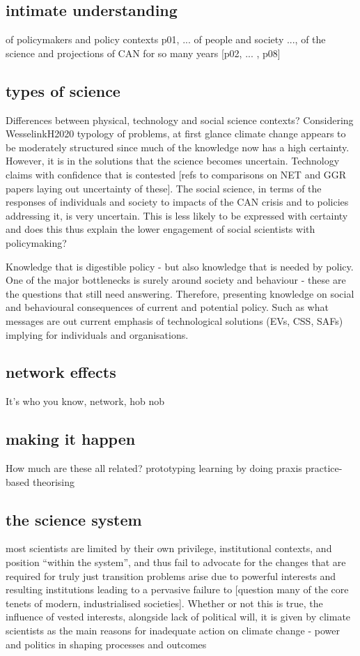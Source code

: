 \subsection{intimate understanding}
of policymakers and policy contexts p01, ...
of people and society ..., of the science and projections of CAN for so many years [p02, ... , p08]

\subsection{types of science}
Differences between physical, technology and social science contexts?
Considering WesselinkH2020 typology of problems, at first glance climate change appears to be moderately structured since much of the knowledge now has a high certainty. However, it is in the solutions that the science becomes uncertain. Technology claims with confidence that is contested [refs to comparisons on NET and GGR papers laying out uncertainty of these]. The social science, in terms of the responses of individuals and society to impacts of the CAN crisis and to policies addressing it, is very uncertain. This is less likely to be expressed with certainty and does this thus explain the lower engagement of social scientists with policymaking?

Knowledge that is digestible policy - but also knowledge that is needed by policy. One of the major bottlenecks is surely around society and behaviour - these are the questions that still need answering. Therefore, presenting knowledge on social and behavioural consequences of current and potential policy. Such as what messages are out current emphasis of technological solutions (EVs, CSS, SAFs) implying for individuals and organisations.

\subsection{network effects}
It's who you know, network, hob nob

\subsection{making it happen}
How much are these all related?
prototyping
learning by doing
praxis
practice-based theorising

\subsection{the science system}
\cite{Bendell2024} most scientists are limited by their own privilege, institutional contexts, and position ``within the system'', and thus fail to advocate for the changes that are required for truly just transition  
\cite{StoddardEtAl2021} problems arise due to powerful interests and resulting institutions leading to a pervasive failure to [question many of the core tenets of modern, industrialised societies]. Whether or not this is true, the influence of vested interests, alongside lack of political will, it is given by climate scientists as the main reasons for inadequate action on climate change \cite{Carrington2024} 
\cite{TurnhoutMWKL2020} - power and politics in shaping processes and outcomes

